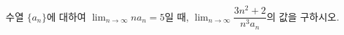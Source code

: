 수열 $\{a_n\}$에 대하여 $\displaystyle\lim_{n\to\infty}na_n=5$일 때, $\displaystyle\lim_{n\to\infty}\dfrac{3n^2+2}{n^3a_n}$의 값을 구하시오.
